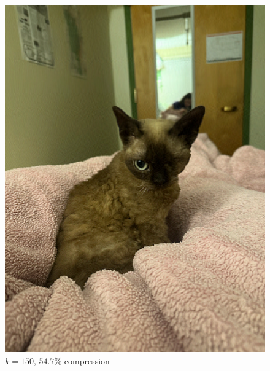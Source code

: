 \documentclass[12pt, letterpaper]{article}
\theoremstyle{definition}
\theoremstyle{remark}
\begin{document}
\begin{figure}[H]
\begin{minipage}[b]{0.4\textwidth}
    \includegraphics[width=\textwidth]{images/compressed_cat_150.png}
    \caption{$k = 150$, $54.7\%$ compression}
  \end{minipage}
\end{figure}
\end{document}
